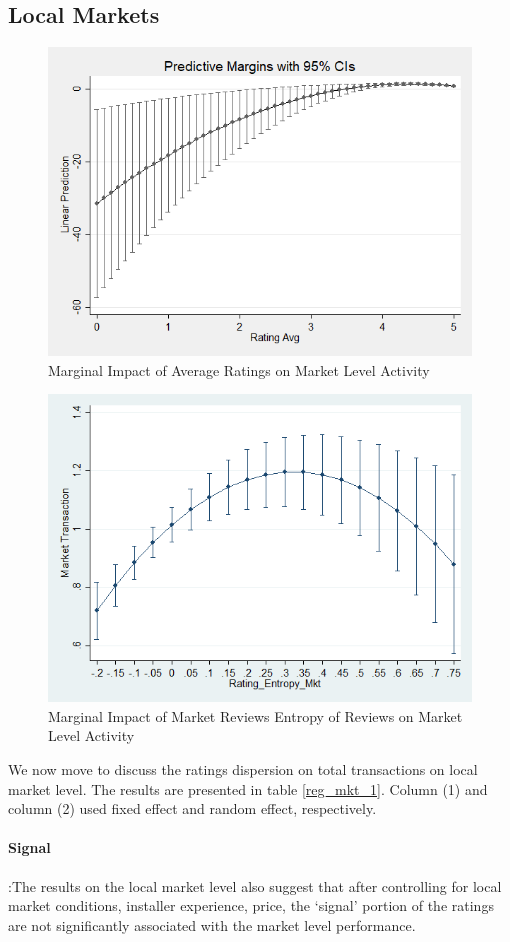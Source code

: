 \documentclass[msom,blindrev]{informs3}
\begin{document}
\subsection{Local Markets}


\begin{figure}
	\centering
	\includegraphics[width=0.7\linewidth]{marginsplot_mkt_0.png}
	\caption{Marginal Impact of Average Ratings on Market Level Activity}
	\label{marginsplot_mkt_0}
\end{figure}

\begin{figure}
	\centering
	\includegraphics[width=0.7\linewidth]{marginsplot_entmkt.png}
	\caption{Marginal Impact of Market Reviews Entropy of Reviews on Market Level Activity}
	\label{marginsplot_mkt_entmkt}
\end{figure}

We now move to discuss the ratings dispersion on total transactions on local market level. The results are presented in table \ref{reg_mkt_1}. Column (1) and column (2) used fixed effect and random effect, respectively. 
\paragraph{Signal}:The results on the local market level also suggest that after controlling for local market conditions, installer experience, price, the `signal' portion of the ratings are not significantly associated with the market level performance.   
\end{document}

